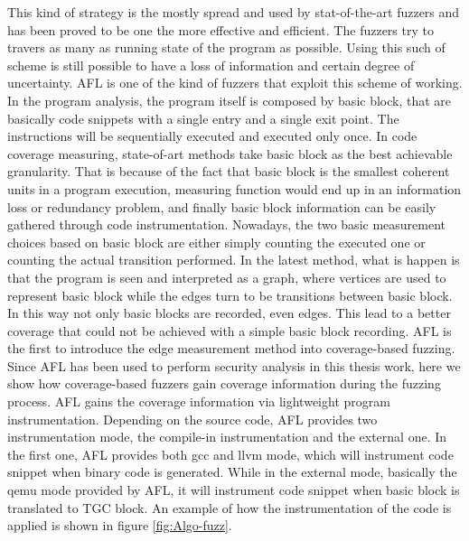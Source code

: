 This kind of strategy is the mostly spread and used by stat-of-the-art fuzzers and has been proved to be one the more effective and efficient.
The fuzzers try to travers as many as running state of the program as possible. Using this such of scheme is still possible to have a loss of information and certain degree of uncertainty.
AFL is one of the kind of fuzzers that exploit this scheme of working.
In the program analysis, the program itself is composed by basic block, that are basically code snippets with a single entry and a single exit point.
The instructions will be sequentially executed and executed only once. In code coverage measuring, state-of-art methods take basic block as the best achievable granularity. That is because of the fact
that basic block is the smallest coherent units in a program execution, measuring function would end up in an information loss or redundancy problem, and finally basic block information can be easily gathered
through code instrumentation. Nowadays, the two basic measurement choices based on basic block are either simply counting the executed one or counting the actual transition performed. In the latest method, what is happen
is that the program is seen and interpreted as a graph, where vertices are used to represent basic block while the edges turn to be transitions between basic block. In this way not only basic blocks are recorded, even edges.
This lead to a better coverage that could not be achieved with a simple basic block recording.
AFL is the first to introduce the edge measurement method into coverage-based fuzzing. Since AFL has been used to perform security analysis in this thesis work, here we show how coverage-based fuzzers
gain coverage information during the fuzzing process. AFL gains the coverage information via lightweight program instrumentation. 
Depending on the source code, AFL provides two instrumentation mode, the compile-in instrumentation and the external one. In the first one, AFL provides
both gcc and llvm mode, which will instrument code snippet when binary code is generated. While in the external mode, basically the qemu mode provided by AFL,
it will instrument code snippet when basic block is translated to TGC block. An example of how the instrumentation of the code is applied is shown in figure \ref{fig:Algo-fuzz}. 

